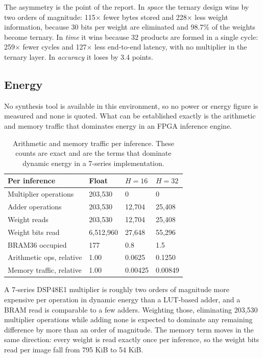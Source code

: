 \documentclass[11pt,a4paper]{article}
\newcommand{\good}{\textcolor{good}{\textbf{}}}
\begin{document}
The asymmetry is the point of the report. In \emph{space} the ternary design wins
by two orders of magnitude: 115$\times$ fewer bytes stored and 228$\times$ less
weight information, because 30 bits per weight are eliminated and 98.7\% of the
weights become ternary. In \emph{time} it wins because 32 products are formed
in a single cycle: 259$\times$ fewer cycles and 127$\times$ less end-to-end
latency, with no multiplier in the ternary layer. In \emph{accuracy} it loses
by 3.4 points.

\subsection{Energy}
\label{sec:energy}

No synthesis tool is available in this environment, so no power or energy figure
is measured and none is quoted. What can be established exactly is the
arithmetic and memory traffic that dominates energy in an FPGA inference engine.

\begin{table}[H]
\centering
\small
\caption{Arithmetic and memory traffic per inference. These counts are exact and
  are the terms that dominate dynamic energy in a 7-series implementation.}
\label{tab:energyproxy}
\begin{tabularx}{\linewidth}{@{}lY Y Y@{}}
\toprule
\textbf{Per inference} & \textbf{Float} & \textbf{$H{=}16$} & \textbf{$H{=}32$} \\
\midrule
Multiplier operations  & 203{,}530 & \good 0 & \good 0 \\
Adder operations       & 203{,}530 & 12{,}704 & 25{,}408 \\
Weight reads            & 203{,}530 & 12{,}704 & 25{,}408 \\
Weight bits read        & 6{,}512{,}960 & \good 27{,}648 & 55{,}296 \\
BRAM36 occupied         & 177       & \good 0.8 & 1.5 \\
\midrule
Arithmetic ops, relative & 1.00     & \good 0.0625 & 0.1250 \\
Memory traffic, relative & 1.00     & \good 0.00425 & 0.00849 \\
\bottomrule
\end{tabularx}
\end{table}

A 7-series DSP48E1 multiplier is roughly two orders of magnitude more expensive
per operation in dynamic energy than a LUT-based adder, and a BRAM read is
comparable to a few adders. Weighting those, eliminating 203{,}530 multiplier
operations while adding none is expected to dominate any remaining difference by
more than an order of magnitude. The memory term moves in the same direction:
every weight is read exactly once per inference, so the weight bits read per
image fall from 795 KiB to 54 KiB.
\end{document}
